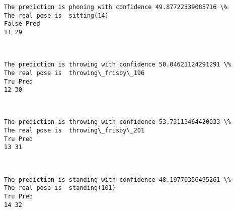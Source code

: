 \documentclass[11pt]{article}
\begin{document}
    \begin{Verbatim}[commandchars=\\\{\}]
The prediction is phoning with confidence 49.87722339085716 \%
The real pose is  sitting(14)
False Pred
11 29

    \end{Verbatim}

    \begin{center}
    \end{center}
    { \hspace*{\fill} \\}
    
    \begin{Verbatim}[commandchars=\\\{\}]
The prediction is throwing with confidence 50.04621124291291 \%
The real pose is  throwing\_frisby\_196
Tru Pred
12 30

    \end{Verbatim}

    \begin{center}
    \end{center}
    { \hspace*{\fill} \\}
    
    \begin{Verbatim}[commandchars=\\\{\}]
The prediction is throwing with confidence 53.73113464420033 \%
The real pose is  throwing\_frisby\_201
Tru Pred
13 31

    \end{Verbatim}

    \begin{center}
    \end{center}
    { \hspace*{\fill} \\}
    
    \begin{Verbatim}[commandchars=\\\{\}]
The prediction is standing with confidence 48.19770356495261 \%
The real pose is  standing(101)
Tru Pred
14 32

    \end{Verbatim}

    \begin{center}
    \end{center}
    { \hspace*{\fill} \\}
    
\end{document}
